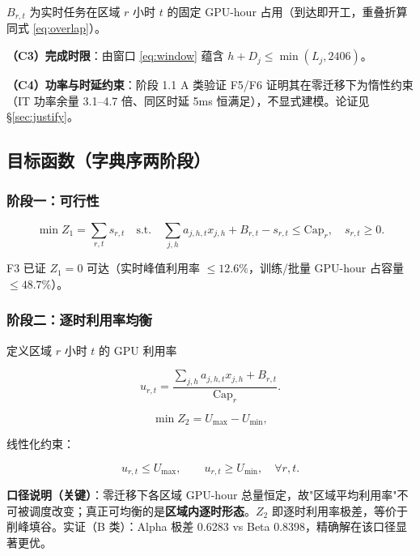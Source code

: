 \documentclass{internal-report}
\begin{document}
$B_{r,t}$ 为实时任务在区域 $r$ 小时 $t$ 的固定 GPU-hour 占用（到达即开工，重叠折算同式 \eqref{eq:overlap}）。

\textbf{（C3）完成时限}：由窗口 \eqref{eq:window} 蕴含 $h + D_j \le \min(L_j,2406)$。

\textbf{（C4）功率与时延约束}：阶段 1.1 A 类验证 F5/F6 证明其在零迁移下为惰性约束（IT 功率余量 3.1--4.7 倍、同区时延 5ms 恒满足），不显式建模。论证见 \S\ref{sec:justify}。

\subsection{目标函数（字典序两阶段）}

\subsubsection{阶段一：可行性}

\begin{equation}
  \min Z_1 = \sum_{r,t} s_{r,t}
  \quad\text{s.t.}\quad
  \sum_{j,h} a_{j,h,t} x_{j,h} + B_{r,t} - s_{r,t} \le \text{Cap}_r,\quad s_{r,t} \ge 0.
  \label{eq:obj1}
\end{equation}

F3 已证 $Z_1=0$ 可达（实时峰值利用率 $\le 12.6\%$，训练/批量 GPU-hour 占容量 $\le 48.7\%$）。

\subsubsection{阶段二：逐时利用率均衡}

定义区域 $r$ 小时 $t$ 的 GPU 利用率

\begin{equation}
  u_{r,t} = \frac{\sum_{j,h} a_{j,h,t} x_{j,h} + B_{r,t}}{\text{Cap}_r}.
  \label{eq:util}
\end{equation}

\begin{equation}
  \min Z_2 = U_{\max} - U_{\min},
  \label{eq:obj2}
\end{equation}

线性化约束：

\begin{equation}
  u_{r,t} \le U_{\max},\qquad u_{r,t} \ge U_{\min},\quad \forall r,t.
  \label{eq:linearization}
\end{equation}

\textbf{口径说明（关键）}：零迁移下各区域 GPU-hour 总量恒定，故"区域平均利用率"不可被调度改变；真正可均衡的是\textbf{区域内逐时形态}。$Z_2$ 即逐时利用率极差，等价于削峰填谷。实证（B 类）：Alpha 极差 0.6283 vs Beta 0.8398，精确解在该口径显著更优。
\end{document}
